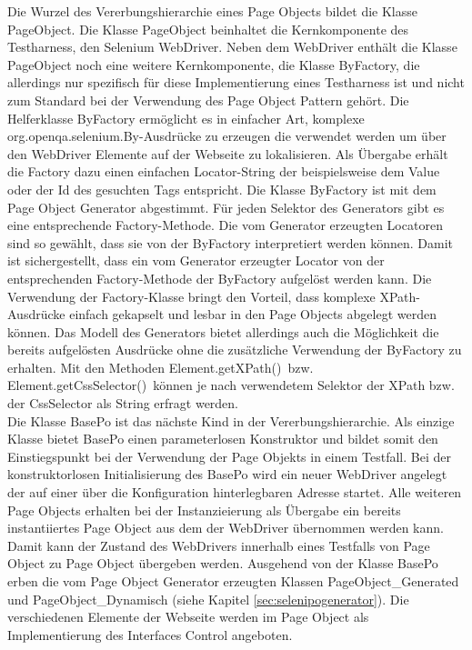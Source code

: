 Die Wurzel des Vererbungshierarchie eines Page Objects bildet die Klasse PageObject. Die Klasse PageObject beinhaltet die Kernkomponente des Testharness, den Selenium WebDriver. Neben dem WebDriver enthält die Klasse PageObject noch eine weitere Kernkomponente, die Klasse ByFactory, die allerdings nur spezifisch für diese Implementierung eines Testharness ist und nicht zum Standard bei der Verwendung des Page Object Pattern gehört.
Die Helferklasse ByFactory ermöglicht es in einfacher Art, komplexe \grq org.openqa.selenium.By\grq -Ausdrücke zu erzeugen die verwendet werden um über den WebDriver Elemente auf der Webseite zu lokalisieren. Als Übergabe erhält die Factory dazu einen einfachen Locator-String der beispielsweise dem Value oder der Id des gesuchten Tags entspricht. Die Klasse ByFactory ist mit dem Page Object Generator abgestimmt. Für jeden Selektor des Generators gibt es eine entsprechende Factory-Methode. Die vom Generator erzeugten Locatoren sind so gewählt, dass sie von der ByFactory interpretiert werden können. Damit ist sichergestellt, dass ein vom Generator erzeugter Locator von der entsprechenden Factory-Methode der ByFactory aufgelöst werden kann.
Die Verwendung der Factory-Klasse bringt den Vorteil, dass komplexe XPath-Ausdrücke einfach gekapselt und lesbar in den Page Objects abgelegt werden können.
Das Modell des Generators bietet allerdings auch die Möglichkeit die bereits aufgelösten Ausdrücke ohne die zusätzliche Verwendung der ByFactory zu erhalten.
Mit den Methoden  \grq Element.getXPath()\grq\ bzw.  \grq Element.getCssSelector()\grq\ können je nach verwendetem Selektor der XPath bzw. der CssSelector als String erfragt werden. \\
Die Klasse BasePo ist das nächste Kind in der Vererbungshierarchie. Als einzige Klasse bietet BasePo einen parameterlosen Konstruktor und bildet somit den Einstiegspunkt bei der Verwendung der Page Objekts in einem Testfall. Bei der konstruktorlosen Initialisierung des BasePo wird ein neuer WebDriver angelegt der auf einer über die Konfiguration hinterlegbaren Adresse startet.
Alle weiteren Page Objects erhalten bei der Instanzieierung als Übergabe ein bereits instantiiertes Page Object aus dem der WebDriver übernommen werden kann.
Damit kann der Zustand des WebDrivers innerhalb eines Testfalls von Page Object zu Page Object übergeben werden.
Ausgehend von der Klasse BasePo erben die vom Page Object Generator erzeugten Klassen PageObject\_Generated und PageObject\_Dynamisch (siehe Kapitel \ref{sec:selenipogenerator}).
Die verschiedenen Elemente der Webseite werden im Page Object als Implementierung des Interfaces Control angeboten.
